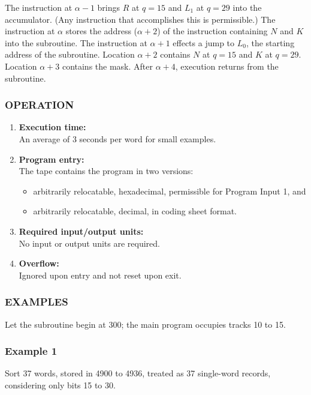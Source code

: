 The instruction at $\alpha-1$ brings $R$ at $q=15$ and $L_1$ at $q=29$ into the accumulator. (Any instruction that accomplishes this is permissible.) The instruction at $\alpha$ stores the address ($\alpha+2$) of the instruction containing $N$ and $K$ into the subroutine. The instruction at $\alpha+1$ effects a jump to $L_0$, the starting address of the subroutine. Location $\alpha+2$ contains $N$ at $q=15$ and $K$ at $q=29$. Location $\alpha+3$ contains the mask. After $\alpha+4$, execution returns from the subroutine.

\subsubsection*{OPERATION}
\begin{enumerate}
    \item \textbf{Execution time:} \\
    An average of 3 seconds per word for small examples.
    \item \textbf{Program entry:} \\
    The tape contains the program in two versions:
    \begin{itemize}
        \item[a)] arbitrarily relocatable, hexadecimal, permissible for Program Input 1, and
        \item[b)] arbitrarily relocatable, decimal, in coding sheet format.
    \end{itemize}
    \item \textbf{Required input/output units:} \\
    No input or output units are required.
    \item \textbf{Overflow:} \\
    Ignored upon entry and not reset upon exit.
\end{enumerate}

\subsubsection*{EXAMPLES}
Let the subroutine begin at 300; the main program occupies tracks 10 to 15.

\subsubsection*{Example 1}
Sort 37 words, stored in 4900 to 4936, treated as 37 single-word records, considering only bits 15 to 30.

